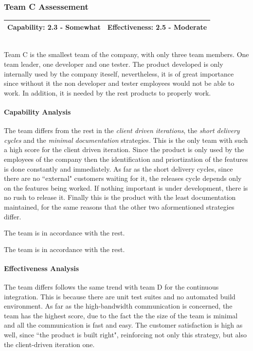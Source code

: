 \subsubsection{Team C Assessement}
\begin{tabular}{| p{6cm} | p{6cm}|}
\hline
\textbf{Capability:} 2.3 - Somewhat & \textbf{Effectiveness:} 2.5 - Moderate \\ \hline
\end{tabular} \\

Team C is the smallest team of the company, with only three team members. One team leader, one developer and one tester. The product developed is only internally used by the company iteself, nevertheless, it is of great importance since without it the non developer and tester employees would not be able to work. In addition, it is needed by the rest products to properly work.

\paragraph{Capability Analysis}

The team differs from the rest in the \textit{client driven iterations}, the \textit{short delivery cycles} and the \textit{minimal documentation} strategies. This is the only team with such a high score for the client driven iteration. Since the product is only used by the employees of the company then the identification and priortization of the features is done constantly and immediately. As far as the short delivery cycles, since there are no ``external" customers waiting for it, the releases cycle depends only on the features being worked. If nothing important is under development, there is no rush to release it. Finally this is the product with the least documentation maintained, for the same reasons that the other two aformentioned strategies differ.

The team is in accordance with the rest.

The team is in accordance with the rest.

\paragraph{Effectiveness Analysis}

The team differs follows the same trend with team D for the continuous integration. This is because there are unit test suites and no automated build environment. As far as the high-bandwidth communication is concerned, the team has the highest score, due to the fact the the size of the team is minimal and all the communication is fast and easy. The customer satisfaction is high as well, since ``the product is built right", reinforcing not only this strategy, but also the client-driven iteration one.

